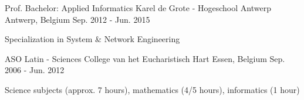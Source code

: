 

\begin{cventries}

  \cventry
    {Prof. Bachelor: Applied Informatics} %
    {Karel de Grote - Hogeschool Antwerp} %
    {Antwerp, Belgium} %
    {Sep. 2012 - Jun. 2015} %
    {
      \begin{cvitems} %
        \item {Specialization in System \& Network Engineering}
      \end{cvitems}
    }

  \cventry
    {ASO Latin - Sciences} %
    {College van het Eucharistisch Hart} %
    {Essen, Belgium} %
    {Sep. 2006 - Jun. 2012} %
    {
      \begin{cvitems} %
        \item {Science subjects (approx. 7 hours), mathematics (4/5 hours), informatics (1 hour)}
      \end{cvitems}
    }

\end{cventries}